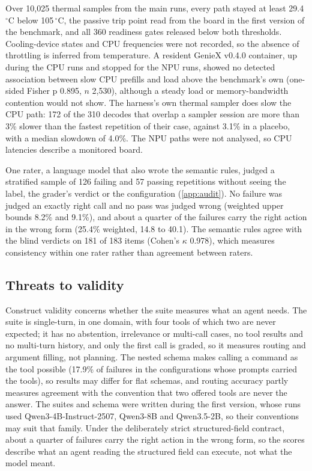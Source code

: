 \documentclass[11pt]{article}
\begin{document}
Over 10,025 thermal samples from the main runs, every path stayed at least 29.4\,$^\circ$C below 105\,$^\circ$C, the passive trip point read from the board in the first version of the benchmark, and all 360 readiness gates released below both thresholds. Cooling-device states and CPU frequencies were not recorded, so the absence of throttling is inferred from temperature. A resident GenieX v0.4.0 container, up during the CPU runs and stopped for the NPU runs, showed no detected association between slow CPU prefills and load above the benchmark's own (one-sided Fisher p 0.895, $n$ 2,530), although a steady load or memory-bandwidth contention would not show. The harness's own thermal sampler does slow the CPU path: 172 of the 310 decodes that overlap a sampler session are more than 3\% slower than the fastest repetition of their case, against 3.1\% in a placebo, with a median slowdown of 4.0\%. The NPU paths were not analysed, so CPU latencies describe a monitored board.

One rater, a language model that also wrote the semantic rules, judged a stratified sample of 126 failing and 57 passing repetitions without seeing the label, the grader's verdict or the configuration (\cref{app:audit}). No failure was judged an exactly right call and no pass was judged wrong (weighted upper bounds 8.2\% and 9.1\%), and about a quarter of the failures carry the right action in the wrong form (25.4\% weighted, 14.8 to 40.1). The semantic rules agree with the blind verdicts on 181 of 183 items (Cohen's $\kappa$ 0.978), which measures consistency within one rater rather than agreement between raters.

\subsection{Threats to validity}\label{sec:validity}

Construct validity concerns whether the suite measures what an agent needs. The suite is single-turn, in one domain, with four tools of which two are never expected; it has no abstention, irrelevance or multi-call cases, no tool results and no multi-turn history, and only the first call is graded, so it measures routing and argument filling, not planning. The nested schema makes calling a command as the tool possible (17.9\% of failures in the configurations whose prompts carried the tools), so results may differ for flat schemas, and routing accuracy partly measures agreement with the convention that two offered tools are never the answer. The suites and schema were written during the first version, whose runs used Qwen3-4B-Instruct-2507, Qwen3-8B and Qwen3.5-2B, so their conventions may suit that family. Under the deliberately strict structured-field contract, about a quarter of failures carry the right action in the wrong form, so the scores describe what an agent reading the structured field can execute, not what the model meant.
\end{document}
